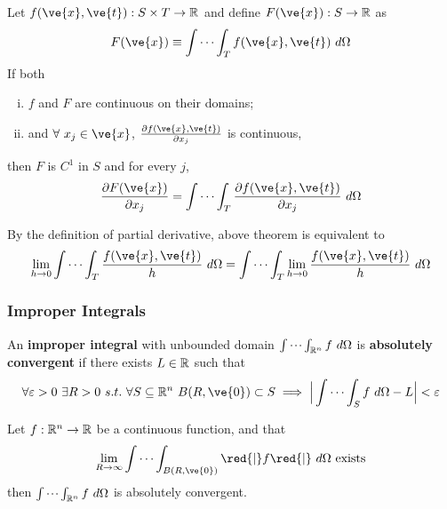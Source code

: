 \documentclass[11pt]{article}
\begin{document}
			\begin{theorem}
				Let $f(\ve{x}, \ve{t}): S \times T \to \R$ and define $F(\ve{x}): S \to \R$ as 
				\begin{equation}
					F(\ve{x}) \equiv \int \cdots \int_T f(\ve{x}, \ve{t})\ d\Omega
				\end{equation}
				If both
				\begin{enumerate}[(i)]
					\item $f$ and $F$ are continuous on their domains;
					\item and $\forall\ x_j \in \ve{x}$, $\pd{f(\ve{x}, \ve{t})}{x_j}$ is continuous,
				\end{enumerate}
				then $F$ is $C^1$ in $S$ and for every $j$,
				\begin{equation}
					\pd{F(\ve{x})}{x_j} = \idotsint_T \pd{f(\ve{x}, \ve{t})}{x_j}\ d\Omega
				\end{equation}
			\end{theorem}
	
			\begin{corollary}
				By the definition of partial derivative, above theorem is equivalent to 
				\begin{equation}
					\lim_{h \to 0} \idotsint_T \frac{f(\ve{x}, \ve{t})}{h}\ d\Omega = \idotsint_T \lim_{h \to 0} \frac{f(\ve{x}, \ve{t})}{h}\ d\Omega
				\end{equation}
			\end{corollary}
			
			\subsubsection{Improper Integrals}
				\begin{definition}
					An \textbf{improper integral} with unbounded domain $\idotsint_{\mathbb{R}^n} f\ d\Omega$ is \textbf{absolutely convergent} if there exists $L \in \mathbb{R}$ such that
					\begin{equation}
						\forall \varepsilon > 0\ \exists R > 0\ s.t.\ \forall S \subseteq \R^n\ B(R, \ve{0}) \subset S \implies \Big|\idotsint_S f\ d\Omega - L \Big| < \varepsilon
					\end{equation}
				\end{definition}
				
				\begin{theorem}
					Let $f: \mathbb{R}^n \to \mathbb{R}$ be a continuous function, and that 
					\begin{equation}
						\lim_{R \to \infty} \idotsint_{B(R, \ve{0})}\red{|}f\red{|}\ d\Omega \tx{ exists}
					\end{equation}
					then $\idotsint_{\mathbb{R}^n}f\ d\Omega$ is absolutely convergent.
				\end{theorem}
				
\end{document}
